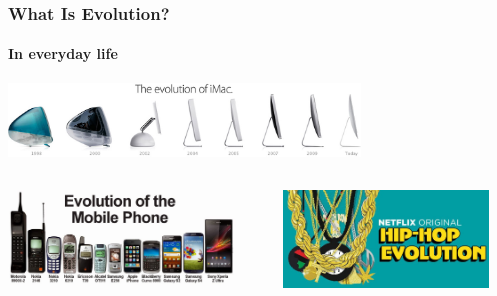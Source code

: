 \documentclass[10pt]{beamer}
\begin{document}
\begin{frame}[t]
\frametitle{What Is Evolution?}
\framesubtitle{In everyday life}

	\begin{center}
		\includegraphics[width=0.7\textwidth]{figures/imac.jpg}	
	\end{center}
	
	\vspace{0.5cm}
	
	\begin{columns}
		\begin{column}{0.5\textwidth}
			\begin{center}
				\includegraphics[width=0.9\textwidth]{figures/phone.jpg}\\	
			\end{center}
		\end{column}
		
		\begin{column}{0.5\textwidth}
			\begin{center}
				\includegraphics[width=0.9\textwidth]{figures/hiphop.jpg}\\
			\end{center}
		\end{column}	
	\end{columns}

\end{frame}
\end{document}
